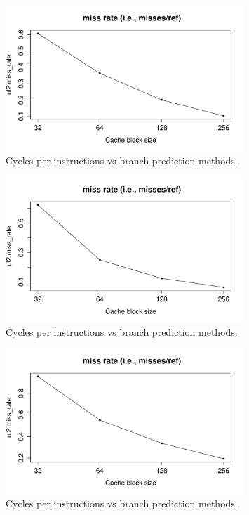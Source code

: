 \documentclass[10pt]{scrartcl}
\begin{document}
\begin{figure}[h]
  \centering
  \includegraphics[width=0.8\textwidth]{NewPlots/plot_BS_miss-rate}
  \caption{Cycles per instructions vs branch prediction methods.}\label{fig:cache-bs_miss_rate}
\end{figure}
\begin{figure}[h]
  \centering
  \includegraphics[width=0.8\textwidth]{NewPlots/plot_BS_A_miss-rate}
  \caption{Cycles per instructions vs branch prediction methods.}\label{fig:cache-bs_A_miss_rate}
\end{figure}
\begin{figure}[h]
  \centering
  \includegraphics[width=0.8\textwidth]{NewPlots/plot_BS_C_miss-rate}
  \caption{Cycles per instructions vs branch prediction methods.}\label{fig:cache-bs_C_miss_rate}
\end{figure}
\end{document}
